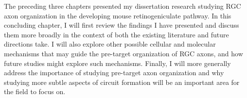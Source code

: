 The preceding three chapters presented my dissertation research studying RGC axon organization in the developing mouse retinogeniculate pathway.
In this concluding chapter, I will first review the findings I have presented and discuss them more broadly in the context of both the existing literature and future directions take.
I will also explore other possible cellular and molecular mechanisms that may guide the pre-target organization of RGC axons, and how future studies might explore such mechanisms.
Finally, I will more generally address the importance of studying pre-target axon organization and why studying more subtle aspects of circuit formation will be an important area for the field to focus on.